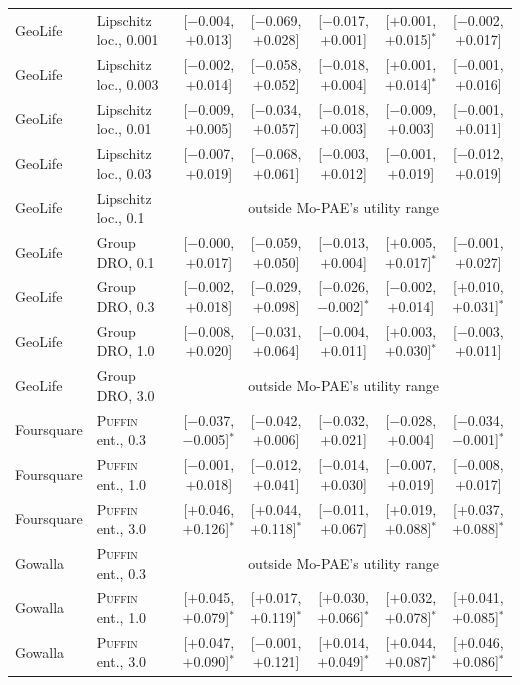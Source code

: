 \documentclass[sigconf,anonymous,review]{acmart}
\newcommand{\puffin}{\textsc{Puffin}}
\begin{document}
\begin{table}[!htbp]
\begin{tabular}{@{}llccccc@{}}
GeoLife & Lipschitz loc., 0.001 & [$-$0.004, $+$0.013] & [$-$0.069, $+$0.028] & [$-$0.017, $+$0.001] & [$+$0.001, $+$0.015]$^*$ & [$-$0.002, $+$0.017] \\
GeoLife & Lipschitz loc., 0.003 & [$-$0.002, $+$0.014] & [$-$0.058, $+$0.052] & [$-$0.018, $+$0.004] & [$+$0.001, $+$0.014]$^*$ & [$-$0.001, $+$0.016] \\
GeoLife & Lipschitz loc., 0.01 & [$-$0.009, $+$0.005] & [$-$0.034, $+$0.057] & [$-$0.018, $+$0.003] & [$-$0.009, $+$0.003] & [$-$0.001, $+$0.011] \\
GeoLife & Lipschitz loc., 0.03 & [$-$0.007, $+$0.019] & [$-$0.068, $+$0.061] & [$-$0.003, $+$0.012] & [$-$0.001, $+$0.019] & [$-$0.012, $+$0.019] \\
GeoLife & Lipschitz loc., 0.1 & \multicolumn{5}{c}{outside Mo-PAE's utility range} \\
GeoLife & Group DRO, 0.1 & [$-$0.000, $+$0.017] & [$-$0.059, $+$0.050] & [$-$0.013, $+$0.004] & [$+$0.005, $+$0.017]$^*$ & [$-$0.001, $+$0.027] \\
GeoLife & Group DRO, 0.3 & [$-$0.002, $+$0.018] & [$-$0.029, $+$0.098] & [$-$0.026, $-$0.002]$^*$ & [$-$0.002, $+$0.014] & [$+$0.010, $+$0.031]$^*$ \\
GeoLife & Group DRO, 1.0 & [$-$0.008, $+$0.020] & [$-$0.031, $+$0.064] & [$-$0.004, $+$0.011] & [$+$0.003, $+$0.030]$^*$ & [$-$0.003, $+$0.011] \\
GeoLife & Group DRO, 3.0 & \multicolumn{5}{c}{outside Mo-PAE's utility range} \\
Foursquare & \puffin{} ent., 0.3 & [$-$0.037, $-$0.005]$^*$ & [$-$0.042, $+$0.006] & [$-$0.032, $+$0.021] & [$-$0.028, $+$0.004] & [$-$0.034, $-$0.001]$^*$ \\
Foursquare & \puffin{} ent., 1.0 & [$-$0.001, $+$0.018] & [$-$0.012, $+$0.041] & [$-$0.014, $+$0.030] & [$-$0.007, $+$0.019] & [$-$0.008, $+$0.017] \\
Foursquare & \puffin{} ent., 3.0 & [$+$0.046, $+$0.126]$^*$ & [$+$0.044, $+$0.118]$^*$ & [$-$0.011, $+$0.067] & [$+$0.019, $+$0.088]$^*$ & [$+$0.037, $+$0.088]$^*$ \\
Gowalla & \puffin{} ent., 0.3 & \multicolumn{5}{c}{outside Mo-PAE's utility range} \\
Gowalla & \puffin{} ent., 1.0 & [$+$0.045, $+$0.079]$^*$ & [$+$0.017, $+$0.119]$^*$ & [$+$0.030, $+$0.066]$^*$ & [$+$0.032, $+$0.078]$^*$ & [$+$0.041, $+$0.085]$^*$ \\
Gowalla & \puffin{} ent., 3.0 & [$+$0.047, $+$0.090]$^*$ & [$-$0.001, $+$0.121] & [$+$0.014, $+$0.049]$^*$ & [$+$0.044, $+$0.087]$^*$ & [$+$0.046, $+$0.086]$^*$ \\

\end{tabular}
\end{table}
\end{document}
